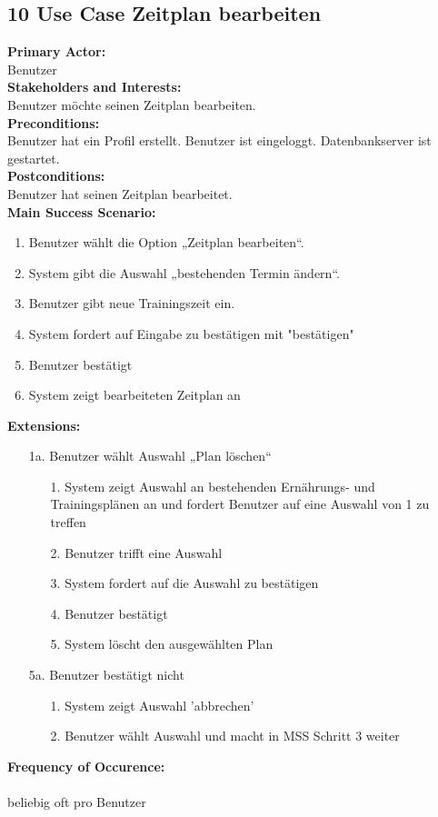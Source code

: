 \documentclass[12pt,a4paper,onecolumn]{article}
\begin{document}
\subsection{10 Use Case Zeitplan bearbeiten}
\textbf{Primary Actor:}\\ Benutzer\\
\textbf{Stakeholders and Interests:}\\
Benutzer möchte seinen \gls{Zeitplan} bearbeiten.\\
\textbf{Preconditions:} \\ Benutzer hat ein Profil erstellt. Benutzer ist eingeloggt. Datenbankserver ist gestartet.\\
\textbf{Postconditions:}\\Benutzer hat seinen \gls{Zeitplan} bearbeitet.\\
\textbf{Main Success Scenario:}
\begin{enumerate}
    \item Benutzer wählt die Option „Zeitplan bearbeiten“. 
    \item System gibt die Auswahl „bestehenden Termin ändern“.
    \item Benutzer gibt neue Trainingszeit ein.
    \item System fordert auf Eingabe zu bestätigen mit "bestätigen"
    \item Benutzer bestätigt
    \item System zeigt bearbeiteten \gls{Zeitplan} an
\end{enumerate}
\textbf{Extensions:}
\begin{enumerate}
    \item [1a.]  Benutzer wählt Auswahl „Plan löschen“
    \begin{enumerate}
        \item[1.]System zeigt Auswahl an bestehenden Ernährungs- und Trainingsplänen an und fordert Benutzer auf eine Auswahl von 1 zu treffen
        \item[2.]Benutzer trifft eine Auswahl 
        \item[3.]System fordert auf die Auswahl zu bestätigen
        \item[4.]Benutzer bestätigt
        \item[5.]System löscht den ausgewählten Plan 
    \end{enumerate}
    \item [5a.]Benutzer bestätigt nicht
    \begin{enumerate}
        \item[1.]System zeigt Auswahl 'abbrechen'
    \item[2.]Benutzer wählt Auswahl und macht in MSS Schritt 3 weiter
    \end{enumerate}
\end{enumerate}
\textbf{Frequency of Occurence:}\\ \\
beliebig oft pro Benutzer
\end{document}
